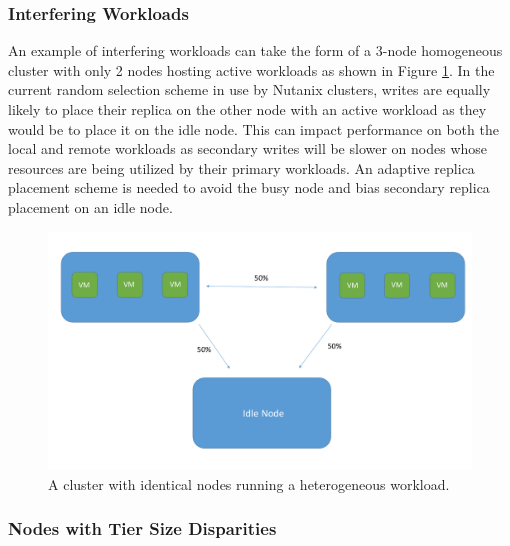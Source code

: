 \documentclass[12pt]{article}
\begin{document}
    \subsubsection{Interfering Workloads}

    An example of interfering workloads can take the form of a 3-node
    homogeneous cluster with only 2 nodes hosting active workloads as shown in
    Figure \ref{fig:workload_disparity}. In the current random selection scheme
    in use by Nutanix clusters, writes are equally likely to place their
    replica on the other node with an active workload as they would be to place
    it on the idle node. This can impact performance on both the local and
    remote workloads as secondary writes will be slower on nodes whose
    resources are being utilized by their primary workloads. An adaptive
    replica placement scheme is needed to avoid the busy node and bias
    secondary replica placement on an idle node. 

    \begin{figure}[htbp]
      \centering
      \includegraphics[scale=0.45]{images/homogeneous_workload_disparity.pdf} 
      \caption{A cluster with identical nodes running a heterogeneous workload.}
      \label{fig:workload_disparity}
    \end{figure}

    \subsubsection{Nodes with Tier Size Disparities}
\end{document}
